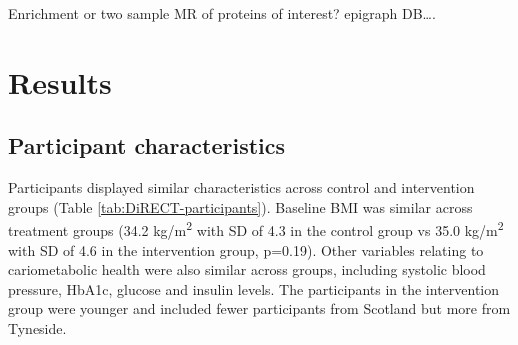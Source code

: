 \documentclass[11pt,twoside]{bristolthesis}
\begin{document}
Enrichment or two sample MR of proteins of interest? epigraph DB\ldots.

\hypertarget{results-4}{%
\section{Results}\label{results-4}}

\hypertarget{participant-characteristics-2}{%
\subsection{Participant characteristics}\label{participant-characteristics-2}}

Participants displayed similar characteristics across control and intervention groups (Table \ref{tab:DiRECT-participants}). Baseline BMI was similar across treatment groups (34.2 kg/m\textsuperscript{2} with SD of 4.3 in the control group vs 35.0 kg/m\textsuperscript{2} with SD of 4.6 in the intervention group, p=0.19). Other variables relating to cariometabolic health were also similar across groups, including systolic blood pressure, HbA1c, glucose and insulin levels. The participants in the intervention group were younger and included fewer participants from Scotland but more from Tyneside.
\end{document}
